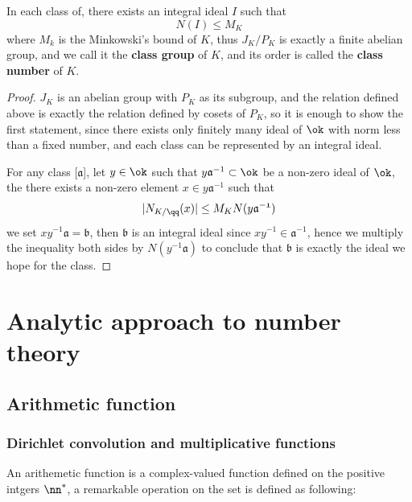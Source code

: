 \begin{colorlemma}
    In each class of, there exists an integral ideal \(I\) such that
    \[N(I) \leq M_K\]
where \(M_k\) is the Minkowski's bound of \(K\), thus \(J_K/P_K\) is exactly a finite abelian group, and we call it the \textbf{class group} of \(K\), and its order is called the \textbf{class number} of \(K\).
\end{colorlemma}
\begin{proof}
    \(J_K\) is an abelian group with \(P_K\) as its subgroup, and the relation defined above is exactly the relation defined by cosets of \(P_K\), so it is enough to show the first statement, since there exists only finitely many ideal of \(\ok\) with norm less than a fixed number, and each class can be represented by an integral ideal.

    For any class [\(\mathfrak{a}\)], let \(y \in \ok\) such that \(y\mathfrak{a}^{-1} \subset \ok\) be a non-zero ideal of \(\ok\), the there exists a non-zero element \(x \in y\mathfrak{a}^{-1}\) such that
    \[|N_{K/\qq}(x)| \leq M_K N(y\mathfrak{a^{-1}})\]
    we set \(xy^{-1}\mathfrak{a} = \mathfrak{b}\), then \(\mathfrak{b}\) is an integral ideal since \(xy^{-1} \in \mathfrak{a}^{-1}\), hence we multiply the inequality both sides by \(N(y^{-1}\mathfrak{a})\) to conclude that \(\mathfrak{b}\) is exactly the ideal we hope for the class.
\end{proof}




\newpage 



 






\newpage

\section{Analytic approach to number theory}

\subsection{Arithmetic function}
\subsubsection{Dirichlet convolution and multiplicative functions}
An arithemetic function is a complex-valued function defined on the positive intgers \(\nn^*\), a remarkable operation on the set is defined as following:


